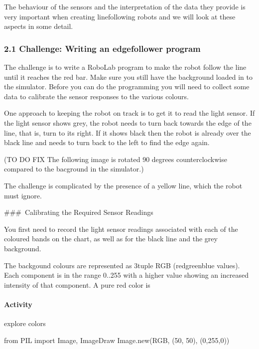 \documentclass[letterpaper,10pt,english]{sphinxmanual}
\begin{document}
{The behaviour of the sensors and the interpretation of the data they provide is very important when creating line\sphinxhyphen{}following robots and we will look at these aspects in some detail.


\subsubsection{2.1 Challenge: Writing an edge\sphinxhyphen{}follower program}
\label{\detokenize{content/04_Robot_Lab/Section_00_02:2.1-Challenge:-Writing-an-edge-follower-program}}
The challenge is to write a RoboLab program to make the robot follow the line until it reaches the red bar. Make sure you still have the  background loaded in to the simulator. Before you can do the programming you will need to collect some data to calibrate the sensor responses to the various colours.

One approach to keeping the robot on track is to get it to read the light sensor. If the light sensor shows grey, the robot needs to turn back towards the edge of the line, that is, turn to its right. If it shows black then the robot is already over the black line and needs to turn back to the left to find the edge again.

(TO DO \sphinxhyphen{} FIX \sphinxhyphen{} The following image is rotated 90 degrees counter\sphinxhyphen{}clockwise compared to the bacground in the simulator.)

The challenge is complicated by the presence of a yellow line, which the robot must ignore.

\#\#\# Calibrating the Required Sensor Readings

You first need to record the light sensor readings associated with each of the coloured bands on the chart, as well as for the black line and the grey background.

The backgound colours are represented as 3\sphinxhyphen{}tuple RGB (red\sphinxhyphen{}green\sphinxhyphen{}blue values). Each component is in the range 0..255 with a higher value showing an increased intensity of that component. A pure red color is


\paragraph{Activity}
\label{\detokenize{content/04_Robot_Lab/Section_00_02:Activity}}
explore colors

{
\begin{sphinxVerbatim}[commandchars=\\\{\}]
\llap{\color{nbsphinxin}[ ]:\,\hspace{\fboxrule}\hspace{\fboxsep}}from PIL import Image, ImageDraw
Image.new(\PYGZsq{}RGB\PYGZsq{}, (50, 50), (0,255,0))
\end{sphinxVerbatim}
}


}
\end{document}
